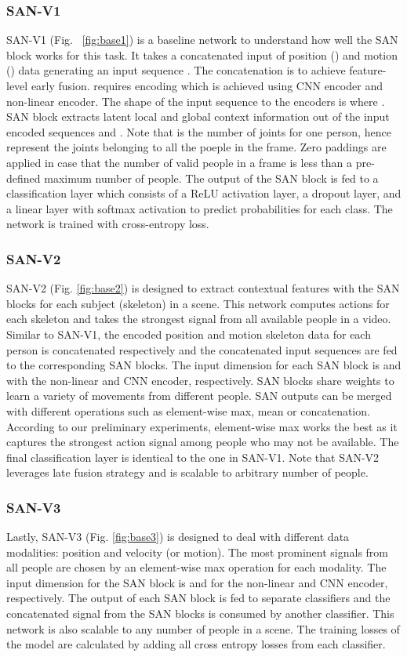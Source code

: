 \documentclass[10pt,twocolumn,letterpaper]{article}
\begin{document}
\subsubsection{SAN-V1}
SAN-V1 (Fig. ~\ref{fig:base1}) is a baseline network to understand how well the SAN block works for this task. It takes a concatenated input of position () and motion () data generating an input sequence . The concatenation is to achieve feature-level early fusion.  requires encoding which is achieved using CNN encoder and non-linear encoder. The shape of the input sequence to the encoders is  where . 
SAN block extracts latent local and global context information out of the input encoded sequences  and .
Note that  is the number of joints for one person, hence  represent the joints belonging to all the poeple in the frame. Zero paddings are applied in case that the number of valid people in a frame is less than a pre-defined maximum number of people.
The output of the SAN block is fed to a classification layer which consists of a ReLU activation layer, a dropout layer, and a linear layer with softmax activation to predict probabilities for each class. The network is trained with cross-entropy loss.

\subsubsection{SAN-V2}
SAN-V2 (Fig. \ref{fig:base2}) is designed to extract contextual features with the SAN blocks for each subject (skeleton) in a scene. This network computes actions for each skeleton and takes the strongest signal from all available people in a video.
Similar to SAN-V1, the encoded position and motion skeleton data for each person is concatenated respectively and the concatenated input sequences are fed to the corresponding SAN blocks.
The input dimension for each SAN block is  and  with the non-linear and CNN encoder, respectively.
SAN blocks share weights to learn a variety of movements from different people. SAN outputs can be merged with different operations such as element-wise max, mean or concatenation. According to our preliminary experiments, element-wise max works the best as it captures the strongest action signal among people who may not be available. The final classification layer is identical to the one in SAN-V1.
Note that SAN-V2 leverages late fusion strategy and is scalable to arbitrary number of people.

\subsubsection{SAN-V3}
Lastly, SAN-V3 (Fig. \ref{fig:base3}) is designed to deal with different data modalities: position and velocity (or motion). 
The most prominent signals from all people are chosen by an element-wise max operation for each modality. The input dimension for the SAN block is  and  for the non-linear and CNN encoder, respectively.
The output of each SAN block is fed to separate classifiers and the concatenated signal from the SAN blocks is consumed by another classifier.
This network is also scalable to any number of people in a scene. The training losses of the model are calculated by adding all cross entropy losses from each classifier.
\end{document}

